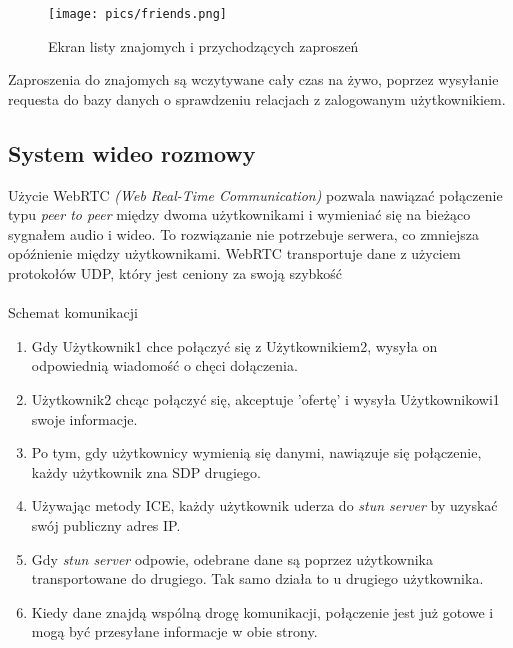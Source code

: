 \documentclass{article}
\begin{document}
\begin{figure}[h]
    \centering
    \texttt{[image: pics/friends.png]}
    \caption*{Ekran listy znajomych i przychodzących zaproszeń}
\end{figure}

Zaproszenia do znajomych są wczytywane cały czas na żywo, poprzez wysyłanie requesta do bazy danych o sprawdzeniu relacjach z zalogowanym użytkownikiem. 

\subsection{System wideo rozmowy}
Użycie WebRTC \textit{(Web Real-Time Communication)} pozwala nawiązać połączenie typu \textit{peer to peer} między dwoma użytkownikami i wymieniać się na bieżąco sygnałem audio i wideo. To rozwiązanie nie potrzebuje serwera, co zmniejsza opóźnienie między użytkownikami. WebRTC transportuje dane z użyciem protokołów UDP, który jest ceniony za swoją szybkość
\\\\
 Schemat komunikacji
 \begin{enumerate}
     \item Gdy Użytkownik1 chce połączyć się z Użytkownikiem2, wysyła on odpowiednią wiadomość o chęci dołączenia.
     \item  Użytkownik2 chcąc połączyć się, akceptuje 'ofertę' i wysyła Użytkownikowi1 swoje informacje.
     \item  Po tym, gdy użytkownicy wymienią się danymi, nawiązuje się połączenie, każdy użytkownik zna SDP drugiego.
     \item Używając metody ICE, każdy użytkownik uderza do \textit{stun server} by uzyskać swój publiczny adres IP.
     \item Gdy \textit{stun server} odpowie, odebrane dane są poprzez użytkownika transportowane do drugiego. Tak samo działa to u drugiego użytkownika.
     \item Kiedy dane znajdą wspólną drogę komunikacji, połączenie jest już gotowe i mogą być przesyłane informacje w obie strony.
 \end{enumerate}
\end{document}
